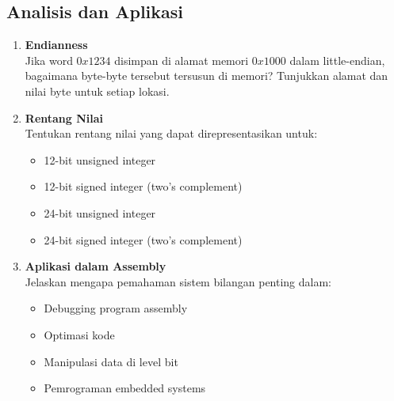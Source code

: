 \subsection{Analisis dan Aplikasi}

\begin{enumerate}
    \item \textbf{Endianness}\\
    Jika word \(0x1234\) disimpan di alamat memori \(0x1000\) dalam little-endian, bagaimana byte-byte tersebut tersusun di memori? Tunjukkan alamat dan nilai byte untuk setiap lokasi.

    \item \textbf{Rentang Nilai}\\
    Tentukan rentang nilai yang dapat direpresentasikan untuk:
    \begin{itemize}
        \item 12-bit unsigned integer
        \item 12-bit signed integer (two's complement)
        \item 24-bit unsigned integer
        \item 24-bit signed integer (two's complement)
    \end{itemize}

    \item \textbf{Aplikasi dalam Assembly}\\
    Jelaskan mengapa pemahaman sistem bilangan penting dalam:
    \begin{itemize}
        \item Debugging program assembly
        \item Optimasi kode
        \item Manipulasi data di level bit
        \item Pemrograman embedded systems
    \end{itemize}
\end{enumerate}


